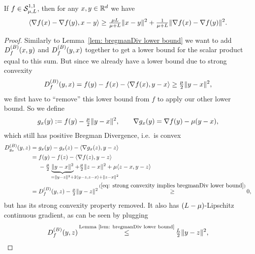 \begin{lemma}
	\label{lem: bregmanDiv lower bound (strongly convex)}
	If \(f\in\mathcal{S}^{1,1}_{{\mu},{L}}\), then for any
	\(x,y\in\mathbb{R}^d\) we have
	\begin{align*}
		\langle \nabla f(x) - \nabla f(y), x-y\rangle 
		\ge \tfrac{\mu L}{\mu+L} \| x-y\|^2
		+ \tfrac{1}{\mu+L}\|\nabla f(x) -\nabla f(y)\|^2.
	\end{align*}
\end{lemma}
\begin{proof}
	Similarly to Lemma~\ref{lem: bregmanDiv lower bound} we want to
	add \(D^{(B)}_{f}(x,y)\) and \(D^{(B)}_{f}(y,x)\) together to
	get a lower bound for the scalar product equal to this sum. But since we
	already have a lower bound due to strong convexity
	\begin{align}\label{eq: strong convexity implies bregmanDiv lower bound}
		D^{(B)}_{f}(y,x) = f(y) - f(x) -\langle\nabla f(x), y-x\rangle
		\ge \tfrac{\mu}2 \|y-x\|^2,
	\end{align}
	we first have to ``remove'' this lower bound from \(f\) to apply our other
	lower bound. So we define
	\begin{align*}
		g_x(y) := f(y) - \tfrac{\mu}2\|y-x\|^2, \qquad
		\nabla g_x(y) = \nabla f(y) - \mu(y-x),
	\end{align*}
	which still has positive Bregman Divergence, i.e.\ is convex 
	\begin{align*}
		\bregmanDiv{g_x}(y,z)
		&= g_x(y) - g_x(z) - \langle\nabla g_x(z), y-z\rangle \\
		&= 
		\begin{aligned}[t]
			& f(y) - f(z) -\langle\nabla f(z), y-z\rangle \\
			&- \tfrac\lbound{2}\underbrace{\|y-x\|^2}_{
				=\|y-z\|^2 + \mathrlap{2\langle y-z, z-x\rangle + \|z-x\|^2}
			}
			+ \tfrac\lbound{2}\|z-x\|^2
			+ \lbound\langle z-x, y-z\rangle
		\end{aligned}\\
		&= \bregmanDiv{f}(y,z) - \tfrac{\lbound}2\|y-z\|^2
		\xge{(\ref{eq: strong convexity implies bregmanDiv lower bound})} 0,
	\end{align*}
	but has its strong convexity property removed.
	It also has \((L-\mu)\)-Lipschitz continuous gradient, as can be
	seen by plugging
	\begin{align}
		\label{eq: bregmanDiv upper bound}
		\bregmanDiv{f}(y,z) \xle{\text{Lemma \ref{lem: bregmanDiv lower bound}}} \tfrac{\ubound}2\|y-z\|^2,

\end{align}
\end{proof}
